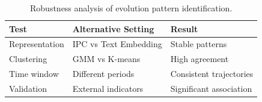
\begin{table}[t]
\centering
\caption{Robustness analysis of evolution pattern identification.}
\begin{tabular}{lll}
\toprule
Test & Alternative Setting & Result\\
\midrule
Representation & IPC vs Text Embedding & Stable patterns\\
Clustering & GMM vs K-means & High agreement\\
Time window & Different periods & Consistent trajectories\\
Validation & External indicators & Significant association\\
\bottomrule
\end{tabular}
\label{tab:robustness}
\end{table}
